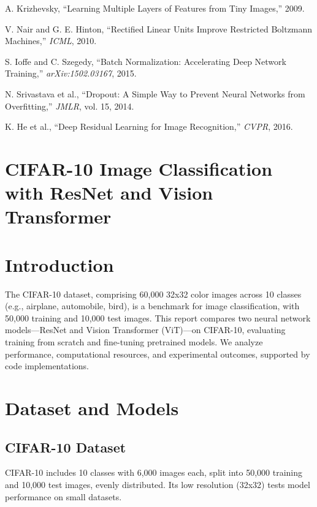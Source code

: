 \documentclass[UTF8]{report}
\theoremstyle{MyLineTheoremStyle} %
\theoremstyle{MyBlockTheoremStyle} %
\theoremstyle{MySubsubsectionStyle} %
\begin{document}
\begin{thebibliography}{9}
A. Krizhevsky, ``Learning Multiple Layers of Features from Tiny Images,'' 2009.

V. Nair and G. E. Hinton, ``Rectified Linear Units Improve Restricted Boltzmann Machines,'' \textit{ICML}, 2010.

S. Ioffe and C. Szegedy, ``Batch Normalization: Accelerating Deep Network Training,'' \textit{arXiv:1502.03167}, 2015.

N. Srivastava et al., ``Dropout: A Simple Way to Prevent Neural Networks from Overfitting,'' \textit{JMLR}, vol. 15, 2014.

K. He et al., ``Deep Residual Learning for Image Recognition,'' \textit{CVPR}, 2016.
\end{thebibliography}






\cleardoublepage


\section{CIFAR-10 Image Classification with ResNet and Vision Transformer}

\section*{Introduction}
The CIFAR-10 dataset, comprising 60,000 32x32 color images across 10 classes (e.g., airplane, automobile, bird), is a benchmark for image classification, with 50,000 training and 10,000 test images. This report compares two neural network models—ResNet and Vision Transformer (ViT)—on CIFAR-10, evaluating training from scratch and fine-tuning pretrained models. We analyze performance, computational resources, and experimental outcomes, supported by code implementations.

\section*{Dataset and Models}
\subsection*{CIFAR-10 Dataset}
CIFAR-10 includes 10 classes with 6,000 images each, split into 50,000 training and 10,000 test images, evenly distributed. Its low resolution (32x32) tests model performance on small datasets.
\end{document}
